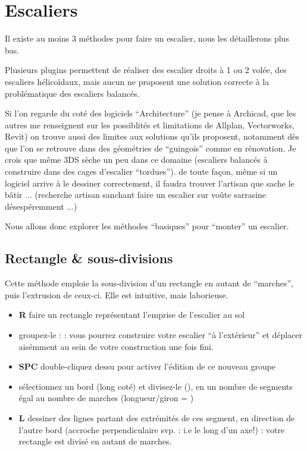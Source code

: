 \documentclass[a4paper,12pt,french]{sphinxmanual}
\begin{document}
\section{Escaliers}
\label{su/escalier:escalier-su}\label{su/escalier::doc}\label{su/escalier:escaliers}
Il existe au moins 3 méthodes pour faire un escalier, nous les détaillerons plus bas.

Plusieurs plugins permettent de réaliser des escalier droits à 1 ou 2 volée, des escaliers hélicoïdaux, mais aucun ne proposent une solution correcte à la problématique des escaliers balancés.

Si l'on regarde du coté des logiciels ``Architecture'' (je pense à Archicad, que les autres me renseignent sur les possiblités et limitations de Allplan, Vectorworks, Revit) on trouve aussi des limites aux solutions qu'ils proposent, notamment dès que l'on se retrouve dans des géométries de ``guingois'' comme en rénovation. Je crois que même 3DS sèche un peu dans ce domaine (escaliers balancés à construire dans des cages d'escalier ``tordues''). de toute façon, même si un logiciel arrive à le dessiner correctement, il faudra trouver l'artisan que sache le bâtir ... (recherche artisan sanchant faire un escalier sur voûte sarrasine désespéremment ...)

Nous allons donc explorer les méthodes ``basiques'' pour ``monter'' un escalier.


\subsection{Rectangle \& sous-divisions}
\label{su/escalier:rectangle-sous-divisions}
Cette méthode emploie la sous-division d'un rectangle en autant de ``marches'', puis l'extrusion de ceux-ci. Elle est intuitive, mais laborieuse.
\begin{itemize}
\item {} 
\textbf{R} faire un rectangle représentant l'emprise de l'escalier au sol

\item {} 
groupez-le :  : vous pourrez construire votre escalier ``à l'extérieur'' et déplacer aisémment au sein de votre construction une fois fini.

\item {} 
\textbf{SPC} double-cliquez dessu pour activer l'édition de ce nouveau groupe

\item {} 
sélectionnez un bord (long coté) et divisez-le (), en un nombre de segments égal au nombre de marches (longueur/giron = )

\item {} 
\textbf{L} dessiner des lignes partant des extrémités de ces segment, en direction de l'autre bord (accroche perpendiculaire svp. : i.e le long d'un axe!) : votre rectangle est divisé en autant de marches.

\end{itemize}
\end{document}
